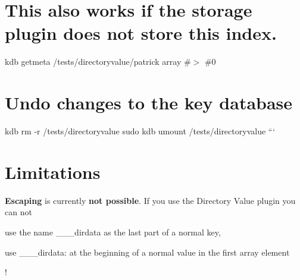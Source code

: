 \section*{This also works if the storage plugin does not store this index.}

kdb getmeta /tests/directoryvalue/patrick array \#$>$ \#0

\section*{Undo changes to the key database}

kdb rm -\/r /tests/directoryvalue sudo kdb umount /tests/directoryvalue ```

\section*{Limitations}

{\bfseries Escaping} is currently {\bfseries not possible}. If you use the Directory Value plugin you can not


\begin{DoxyItemize}
\item use the name {\ttfamily \+\_\+\+\_\+\+\_\+dirdata} as the last part of a normal key,
\item use {\ttfamily \+\_\+\+\_\+\+\_\+dirdata\+:} at the beginning of a normal value in the first array element
\end{DoxyItemize}

! 